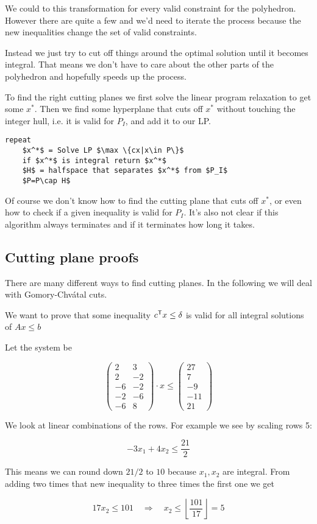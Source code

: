 We could to this transformation for every valid constraint for the polyhedron. However there are quite a few and we'd need to iterate the process because the new inequalities change the set of valid constraints.

Instead we just try to cut off things around the optimal solution until it becomes integral. That means we don't have to care about the other parts of the polyhedron and hopefully speeds up the process.

To find the right cutting planes we first solve the linear program relaxation to get some $x^*$. Then we find some hyperplane that cuts off $x^*$ without touching the integer hull, i.e. it is valid for $P_I$, and add it to our LP.

\begin{lstlisting}
repeat
	$x^*$ = Solve LP $\max \{cx|x\in P\}$
	if $x^*$ is integral return $x^*$
	$H$ = halfspace that separates $x^*$ from $P_I$
	$P=P\cap H$
\end{lstlisting}

Of course we don't know how to find the cutting plane that cuts off $x^*$, or even how to check if a given inequality is valid for $P_I$. It's also not clear if this algorithm always terminates and if it terminates how long it takes.

\subsection{Cutting plane proofs}

There are many different ways to find cutting planes. In the following we will deal with Gomory-Chv\'{a}tal cuts.

We want to prove that some inequality ${c}^\text{\upshape \sffamily T}x\leq \delta$ is valid for all integral solutions of $Ax\leq b$

\begin{Ex}
Let the system be

\[\begin{pmatrix}
2 & 3\\
2 & -2 \\
-6 & -2\\
-2 & -6\\
-6 & 8
\end{pmatrix}\cdot x \leq \begin{pmatrix} 27\\7\\-9\\-11\\21\end{pmatrix}\]

We look at linear combinations of the rows. For example we see by scaling rows 5:

\[-3x_1+4x_2 \leq \frac{21}{2}\]

This means we can round down $21/2$ to $10$ because $x_1,x_2$ are integral. From adding two times that new inequality to three times the first one we get

\[17x_2 \leq 101 \quad \Rightarrow \quad x_2 \leq \left\lfloor \frac{101}{17}\right\rfloor = 5\]
\end{Ex}

